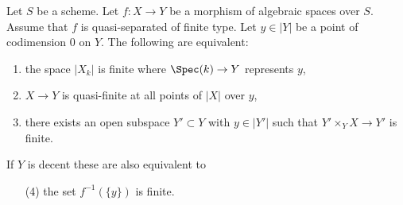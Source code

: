 \begin{lemma}
\label{lemma-generically-finite}
Let $S$ be a scheme. Let $f : X \to Y$ be a morphism of algebraic spaces
over $S$. Assume that $f$ is quasi-separated of finite type.
Let $y \in |Y|$ be a point of codimension $0$ on $Y$.
The following are equivalent:
\begin{enumerate}
\item the space $|X_k|$ is finite where $\Spec(k) \to Y$ represents $y$,
\item $X \to Y$ is quasi-finite at all points of $|X|$ over $y$,
\item there exists an open subspace $Y' \subset Y$ with $y \in |Y'|$
such that $Y' \times_Y X \to Y'$ is finite.
\end{enumerate}
If $Y$ is decent these are also equivalent to
\begin{enumerate}
\item[(4)] the set $f^{-1}(\{y\})$ is finite.
\end{enumerate}
\end{lemma}

